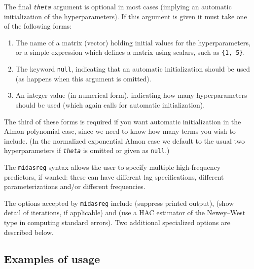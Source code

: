 The final \texttt{\textsl{theta}} argument is optional in most cases
(implying an automatic initialization of the hyperparameters). If this
argument is given it must take one of the following forms:
\begin{enumerate}
\item The name of a matrix (vector) holding initial values for the
  hyperparameters, or a simple expression which defines a matrix
  using scalars, such as \texttt{\{1, 5\}}.
\item The keyword \texttt{null}, indicating that an automatic
  initialization should be used (as happens when this argument is
  omitted).
\item An integer value (in numerical form), indicating how many
  hyperparameters should be used (which again calls for
  automatic initialization).
\end{enumerate}
The third of these forms is required if you want automatic
initialization in the Almon polynomial case, since we need to know how
many terms you wish to include. (In the normalized exponential Almon
case we default to the usual two hyperparameters if
\texttt{\textsl{theta}} is omitted or given as \texttt{null}.)

The \texttt{midasreg} syntax allows the user to specify multiple
high-frequency predictors, if wanted: these can have different lag
specifications, different parameterizations and/or different
frequencies.

The options accepted by \texttt{midasreg} include 
(suppress printed output),  (show detail of
iterations, if applicable) and  (use a HAC estimator of
the Newey--West type in computing standard errors).  Two additional
specialized options are described below.

\subsection{Examples of usage}

